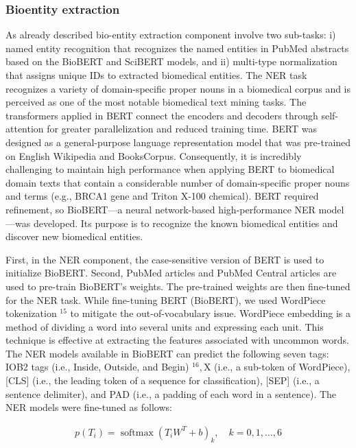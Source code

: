 \subsubsection{Bioentity extraction}
As already described bio-entity extraction component involve two sub-tasks: i) named entity recognition that recognizes the named entities in PubMed abstracts based on the BioBERT and SciBERT models, and ii) multi-type normalization that assigns unique IDs to extracted biomedical entities. The NER task recognizes a variety of domain-specific proper nouns in a
biomedical corpus and is perceived as one of the most notable biomedical text mining tasks.
The transformers applied in BERT connect the encoders and decoders through self-attention for greater parallelization and reduced training time. BERT was designed as a general-purpose language representation model that was pre-trained on English Wikipedia and BooksCorpus. Consequently, it is incredibly challenging to maintain high performance when applying BERT to biomedical domain texts that contain a considerable number of domain-specific proper nouns and terms (e.g., BRCA1 gene and Triton X-100 chemical). BERT required refinement, so BioBERT—a neural network-based high-performance NER model—was developed. Its purpose is to
recognize the known biomedical entities and discover new biomedical entities. 

\hspace*{3.5mm} First, in the NER component, the case-sensitive version of BERT is used to initialize BioBERT. Second, PubMed articles and PubMed Central articles are used to pre-train BioBERT's weights. The pre-trained weights are then fine-tuned for the NER task. While fine-tuning BERT (BioBERT), we used WordPiece tokenization $^{15}$ to mitigate the out-of-vocabulary issue. WordPiece embedding is a method of dividing a word into several units %
and expressing each unit. This technique is effective at extracting the features associated with uncommon words. The NER models available in BioBERT can predict the following seven tags: IOB2 tags (i.e., Inside, Outside, and Begin) $^{16}, \mathrm{X}$ (i.e., a sub-token of WordPiece), [CLS] (i.e., the leading token of a sequence for classification), [SEP] (i.e., a sentence delimiter), and PAD (i.e., a padding of each word in a sentence). The NER models were fine-tuned as follows:

\begin{align}
    p\left(T_{i}\right)=\operatorname{softmax}\left(T_{i} W^{T}+b\right)_{k}, \quad k=0,1, \ldots, 6
\end{align}

